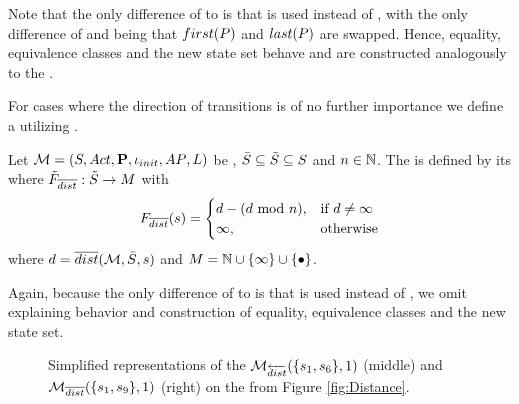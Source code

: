 \documentclass[preview]{standalone}
\begin{document}
Note that the only difference of \viewdistancerev to \viewdistance is that \distpathrev is used instead of \distpath, with the only difference of \distpath and \distpathrev being that ${first}({P})$ and ${last}({P})$ are swapped. Hence, equality, equivalence classes and the new state set behave and are constructed analogously to the \viewN \viewdistance.

For cases where the direction of transitions is of no further importance we define a \viewN \viewdistancebi utilizing \distpathbi.

\begin{definition}
	Let ${{{\mathcal{M}}}} = {{({S}, {Act}, {\textbf{P}}, {\iota_{init}}, {AP}, {L})}}$ be \achgphN, $\bar{{S}} \subseteq {\tilde{\ensuremath{{S}}}} \subseteq {S}$ and $n \in {\mathbb{N}}$. The \viewN \viewdistancebi is defined by its \grpfctN \gfctdistancebi where ${{\tilde{F}_{{{\overline{dist}}}}}} : {\tilde{{S}}} \to {\ensuremath{{M}}}$ with 
	\[
	{{F_{{{\overline{dist}}}}}}({s}) =
	\begin{cases}
		{d} - ({d} \text{ mod } n), &\text{if } d \neq \infty \\
		\infty, &\text{otherwise}
	\end{cases}		
	\]
	where ${d} = {\overline{dist}}({{{\mathcal{M}}}},\bar{{S}}, {s})$ and $\imggrp = \natnums \cup \{\infty\} \cup \remset$.
\end{definition}

Again, because the only difference of \viewdistancebi to \viewdistance is that \distpathbi is used instead of \distpath, we omit explaining behavior and construction of equality, equivalence classes and the new state set.

\begin{figure}[h]
	\begin{minipage}{.5\textwidth}
		\hspace{15mm}		
		\centering 
	\end{minipage}%
	\begin{minipage}{.5\textwidth}
		\hspace{10mm}		
		\centering 
	\end{minipage}	
	\caption{Simplified representations of the \viewsN ${{{{{\mathcal{M}}}}_{{{\overleftarrow{dist}}}}}}(\{{s}_1, {s}_6\}, 1)$ (middle) and ${{{{{\mathcal{M}}}}_{{{\overline{dist}}}}}}(\{{s}_1, {s}_9\}, 1)$ (right) on the \chgph from Figure \ref{fig:Distance}.} 
	\label{fig:DistanceRevBi}  
\end{figure}

\end{document}
